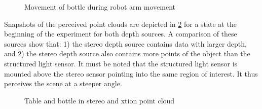 \begin{figure}[h]
\centering
{}
\caption{Movement of bottle during robot arm movement}
\label{fig:bottle_movement}
\end{figure}

Snapshots of the perceived point clouds are depicted in \cref{fig:bottle_point_cloud} for a state at the beginning of the experiment for both depth sources. A comparison of these sources show that: 1) the stereo depth source contains data with larger depth, and 2) the stereo depth source also contains more points of the object than the structured light sensor. It must be noted that the structured light sensor is mounted above the stereo sensor pointing into the same region of interest. It thus perceives the scene at a steeper angle.

\begin{figure}
\centering
{}
\hspace{1cm}
\caption{Table and bottle in stereo and xtion point cloud}
\label{fig:bottle_point_cloud}
\end{figure}


